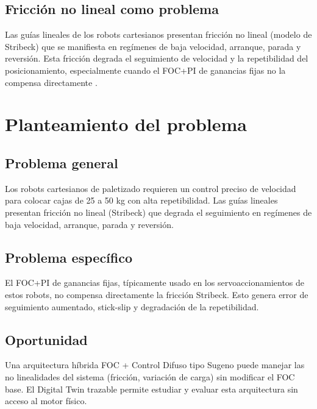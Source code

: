 \subsection{Fricción no lineal como problema}
\label{subsec:friccion_problema}

Las guías lineales de los robots cartesianos presentan fricción no lineal (modelo de Stribeck) que se manifiesta en regímenes de baja velocidad, arranque, parada y reversión. Esta fricción degrada el seguimiento de velocidad y la repetibilidad del posicionamiento, especialmente cuando el FOC+PI de ganancias fijas no la compensa directamente \cite{armstrong1994survey, dewit1995new}.

\section{Planteamiento del problema}
\label{sec:problema}

\subsection{Problema general}
\label{subsec:problema_general}

Los robots cartesianos de paletizado requieren un control preciso de velocidad para colocar cajas de 25 a 50 kg con alta repetibilidad. Las guías lineales presentan fricción no lineal (Stribeck) que degrada el seguimiento en regímenes de baja velocidad, arranque, parada y reversión.

\subsection{Problema específico}
\label{subsec:problema_especifico}

El FOC+PI de ganancias fijas, típicamente usado en los servoaccionamientos de estos robots, no compensa directamente la fricción Stribeck. Esto genera error de seguimiento aumentado, stick-slip y degradación de la repetibilidad.

\subsection{Oportunidad}
\label{subsec:oportunidad}

Una arquitectura híbrida FOC + Control Difuso tipo Sugeno puede manejar las no linealidades del sistema (fricción, variación de carga) sin modificar el FOC base. El Digital Twin trazable permite estudiar y evaluar esta arquitectura sin acceso al motor físico.


